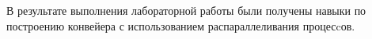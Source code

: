 \Conclusion %
В результате выполнения лабораторной работы были получены навыки по построению конвейера с использованием распараллеливания процесcов.
